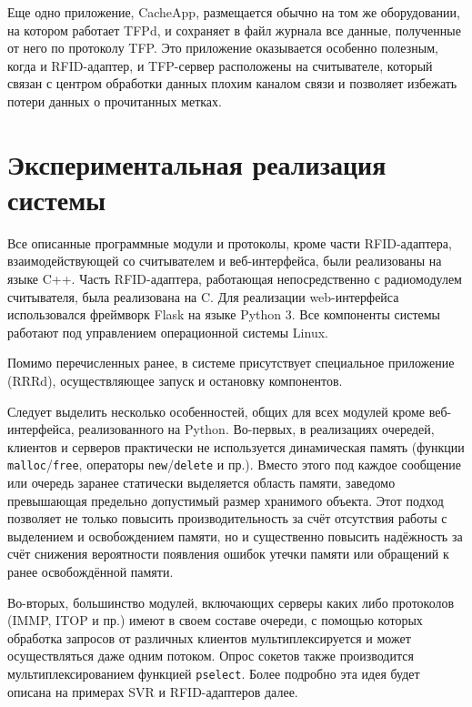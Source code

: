 Еще одно приложение, CacheApp, размещается обычно на том же оборудовании, на котором работает TFPd, и сохраняет в файл журнала все данные, полученные от него по протоколу TFP. Это приложение оказывается особенно полезным, когда и RFID-адаптер, и TFP-сервер расположены на считывателе, который связан с центром обработки данных плохим каналом связи и позволяет избежать потери данных о прочитанных метках.



\section{Экспериментальная реализация системы}\label{sec:ch5_implementation}

Все описанные программные модули и протоколы, кроме части RFID-адаптера, взаимодействующей со считывателем и веб-интерфейса, были реализованы на языке C++. Часть RFID-адаптера, работающая непосредственно с радиомодулем считывателя, была реализована на C. Для реализации web-интерфейса использовался фреймворк Flask на языке Python 3. Все компоненты системы работают под управлением операционной системы Linux.

Помимо перечисленных ранее, в системе присутствует специальное приложение (RRRd), осуществляющее запуск и остановку компонентов.

Следует выделить несколько особенностей, общих для всех модулей кроме веб-интерфейса, реализованного на Python. Во-первых, в реализациях очередей, клиентов и серверов практически не используется динамическая память (функции \texttt{malloc}/\texttt{free}, операторы \texttt{new}/\texttt{delete} и пр.). Вместо этого под каждое сообщение или очередь заранее статически выделяется область памяти, заведомо превышающая предельно допустимый размер хранимого объекта. Этот подход позволяет не только повысить производительность за счёт отсутствия работы с выделением и освобождением памяти, но и существенно повысить надёжность за счёт снижения вероятности появления ошибок утечки памяти или обращений к ранее освобождённой памяти. 
	
Во-вторых, большинство модулей, включающих серверы каких либо протоколов (IMMP, ITOP и пр.) имеют в своем составе очереди, с помощью которых обработка запросов от различных клиентов мультиплексируется и может осуществляться даже одним потоком. Опрос сокетов также производится мультиплексированием функцией \texttt{pselect}. Более подробно эта идея будет описана на примерах SVR и RFID-адаптеров далее.
	
